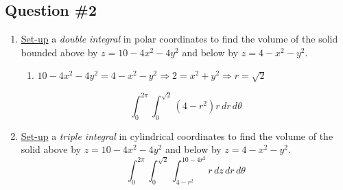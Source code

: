 \documentclass[letter,11pt]{article}
\begin{document}
\subsection{Question \#2}
\begin{enumerate}[label = \roman*.]
    \item \underline{Set-up} a \textit{double integral} in polar coordinates to find the volume of the solid bounded above by $z = 10 -4x^2-4y^2$ and below by $z=4-x^2-y^2$.
    \begin{enumerate}
        \item $10-4x^2-4y^2 = 4-x^2-y^2 \Longrightarrow 2=x^2+y^2 \Longrightarrow r= \sqrt{2}$
    \end{enumerate}
    $$\boxed{\int_{0}^{2\pi}\int_{0}^{\sqrt{2}}\left(4-r^{2}\right) r\, dr\, d\theta}$$
    \item \underline{Set-up} a \textit{triple integral} in cylindrical coordinates to find the volume of the solid  above by $z = 10 -4x^2-4y^2$ and below by $z=4-x^2-y^2$.
    $$\boxed{\int_{0}^{2\pi}\int_{0}^{\sqrt{2}}\int_{4-r^{2}}^{10-4r^{2}}r \, dz\, dr \, d\theta }$$
\end{enumerate}
\newpage
\end{document}
